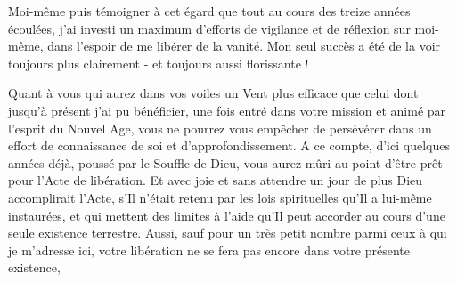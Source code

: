 Moi-même puis témoigner à cet égard que tout au cours des treize années écoulées, j'ai investi un maximum d'efforts de vigilance et de réflexion sur moi-même, dans l'espoir de me libérer de la vanité. Mon seul succès a été de la voir toujours plus clairement - et toujours aussi florissante !

Quant à vous qui aurez dans vos voiles un Vent plus efficace que celui dont jusqu'à présent j'ai pu bénéficier, une fois entré dans votre mission et animé par l'esprit du Nouvel Age, vous ne pourrez vous empêcher de persévérer dans un effort de connaissance de soi et d'approfondissement. A ce compte, d'ici quelques années déjà, poussé par le Souffle de Dieu, vous aurez mûri au point d'être prêt pour l'Acte de libération. Et avec joie et sans attendre un jour de plus Dieu accomplirait l'Acte, s'Il n'était retenu par les lois spirituelles qu'Il a lui-même instaurées, et qui mettent des limites à l'aide qu'Il peut accorder au cours d'une seule existence terrestre. Aussi, sauf pour un très petit nombre parmi ceux à qui je m'adresse ici, votre libération ne se fera pas encore dans votre présente existence,

